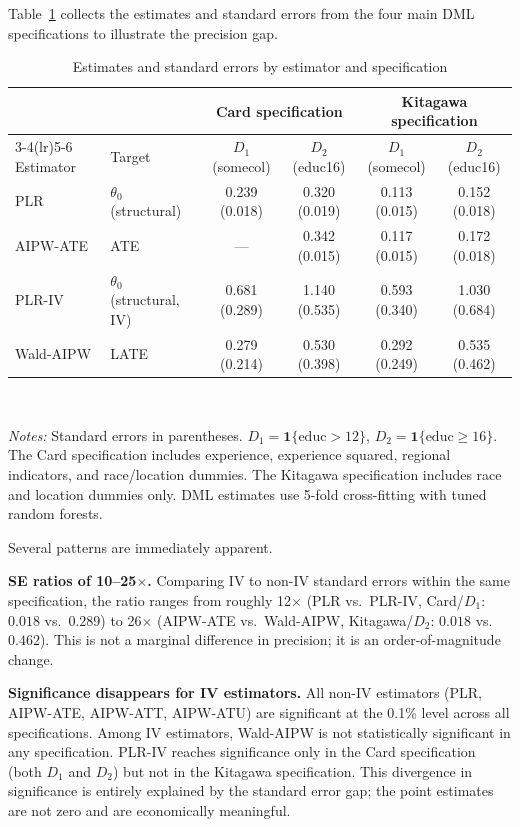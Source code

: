 \documentclass[12pt,a4paper]{article}
\begin{document}
Table~\ref{tab:se_comparison} collects the estimates and standard errors from the four
main DML specifications to illustrate the precision gap.

\begin{table}[htbp]
\centering
\caption{Estimates and standard errors by estimator and specification}
\label{tab:se_comparison}
\smallskip
\begin{tabular}{llcccc}
\toprule
 & & \multicolumn{2}{c}{Card specification}
   & \multicolumn{2}{c}{Kitagawa specification} \\
\cmidrule(lr){3-4}\cmidrule(lr){5-6}
Estimator & Target & $D_1$ (somecol) & $D_2$ (educ16)
          & $D_1$ (somecol) & $D_2$ (educ16) \\
\midrule
PLR       & $\theta_0$ (structural)
  & 0.239 (0.018) & 0.320 (0.019) & 0.113 (0.015) & 0.152 (0.018) \\
AIPW-ATE  & ATE
  & ---           & 0.342 (0.015) & 0.117 (0.015) & 0.172 (0.018) \\
\midrule
PLR-IV    & $\theta_0$ (structural, IV)
  & 0.681 (0.289) & 1.140 (0.535) & 0.593 (0.340) & 1.030 (0.684) \\
Wald-AIPW & LATE
  & 0.279 (0.214) & 0.530 (0.398) & 0.292 (0.249) & 0.535 (0.462) \\
\bottomrule
\end{tabular}
\smallskip\\
\raggedright\small
\textit{Notes:} Standard errors in parentheses.  $D_1 = \mathbf{1}\{\mathrm{educ}>12\}$,
$D_2 = \mathbf{1}\{\mathrm{educ}\geq 16\}$.  The Card specification includes experience,
experience squared, regional indicators, and race/location dummies.  The Kitagawa
specification includes race and location dummies only.  DML estimates use 5-fold
cross-fitting with tuned random forests.
\end{table}

\noindent Several patterns are immediately apparent.

\medskip\noindent\textbf{SE ratios of 10--25$\times$.}
Comparing IV to non-IV standard errors within the same specification, the ratio ranges
from roughly 12$\times$ (PLR vs.\ PLR-IV, Card/$D_1$: $0.018$ vs.\ $0.289$) to 26$\times$
(AIPW-ATE vs.\ Wald-AIPW, Kitagawa/$D_2$: $0.018$ vs.\ $0.462$).  This is not
a marginal difference in precision; it is an order-of-magnitude change.

\medskip\noindent\textbf{Significance disappears for IV estimators.}
All non-IV estimators (PLR, AIPW-ATE, AIPW-ATT, AIPW-ATU) are significant at the
0.1\% level across all specifications.  Among IV estimators, Wald-AIPW is not
statistically significant in any specification.  PLR-IV reaches significance only in
the Card specification (both $D_1$ and $D_2$) but not in the Kitagawa specification.
This divergence in significance is entirely explained by the standard error gap; the
point estimates are not zero and are economically meaningful.
\end{document}
